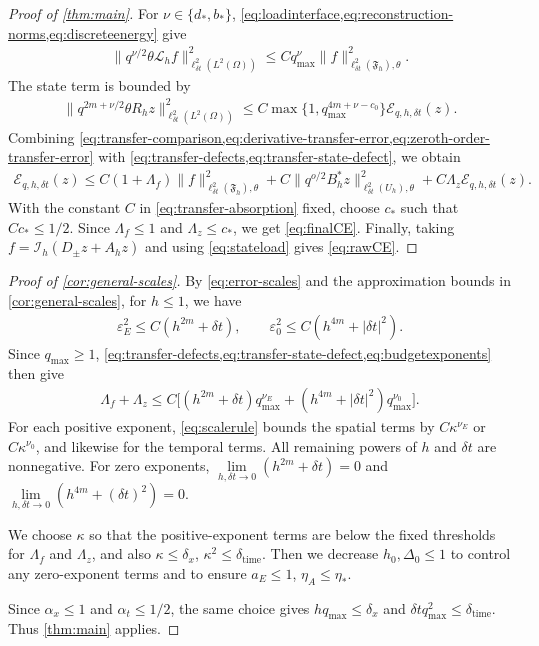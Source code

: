 \documentclass[print,wide,eng]{draft}
\begin{document}
\begin{proof}[Proof of \cref{thm:main}]
For $\nu\in\{d_*,b_*\}$, \cref{eq:loadinterface,eq:reconstruction-norms,eq:discreteenergy} give\vspace{-2mm}
%
\begin{align*}
\|q^{\nu/2}\theta\mathcal L_hf\|_{\ell_{\delta t}^2(L^2(\Omega))}^2
\leq Cq_{\max}^{\nu}\|f\|_{\ell_{\delta t}^2(\mathfrak F_h),\theta}^2.
\end{align*}
%
The state term is bounded by\vspace{-2mm}
%
\begin{align*}
\|q^{2m+\nu/2}\theta R_hz\|_{\ell_{\delta t}^2(L^2(\Omega))}^2
\leq C\max\{1,q_{\max}^{4m+\nu-c_0}\}\mathcal E_{q,h,{\delta t}}(z).
\end{align*}
%
Combining \cref{eq:transfer-comparison,eq:derivative-transfer-error,eq:zeroth-order-transfer-error} with \cref{eq:transfer-defects,eq:transfer-state-defect}, we obtain
%
\begin{align}\label{eq:transfer-absorption}
\mathcal E_{q,h,{\delta t}}(z)\leq C(1+\Lambda_f)\|f\|_{\ell_{\delta t}^2(\mathfrak F_h),\theta}^2
+C\|q^{o/2}B_h^*z\|_{\ell_{\delta t}^2(U_h),\theta}^2
+C\Lambda_z\mathcal E_{q,h,{\delta t}}(z).
\end{align}
%
With the constant $C$ in \cref{eq:transfer-absorption} fixed, choose $c_*$ such that $Cc_*\leq1/2$. Since $\Lambda_f\leq1$ and $\Lambda_z\leq c_*$, we get \cref{eq:finalCE}. Finally, taking $f=\mathcal I_h(D_\pm z+A_hz)$ and using \cref{eq:stateload} gives \cref{eq:rawCE}.
\end{proof}
%

\begin{proof}[Proof of \cref{cor:general-scales}]
By \cref{eq:error-scales} and the approximation bounds in \cref{cor:general-scales}, for $h\leq1$, we have
%
\begin{align*}
\varepsilon_E^2\leq C(h^{2m}+{\delta t}),\qquad
\varepsilon_0^2\leq C(h^{4m}+{|\delta t|}^2).
\end{align*}
%
Since $q_{\max}\geq1$, \cref{eq:transfer-defects,eq:transfer-state-defect,eq:budgetexponents} then give
%
\begin{align*}
\Lambda_f+\Lambda_z\leq C\bigl[(h^{2m}+{\delta t})q_{\max}^{\nu_E}
+(h^{4m}+{|\delta t|}^2)q_{\max}^{\nu_0}\bigr].
\end{align*}
%
For each positive exponent, \cref{eq:scalerule} bounds the spatial terms by $C\kappa^{\nu_E}$ or $C\kappa^{\nu_0}$, and likewise for the temporal terms. All remaining powers of $h$ and ${\delta t}$ are nonnegative. For zero exponents, $\lim\limits_{h,\delta t\to0}(h^{2m}+\delta t)=0$ and $\lim\limits_{h,\delta t\to0}(h^{4m}+(\delta t)^2)=0$.

We choose $\kappa$ so that the positive-exponent terms are below the fixed thresholds for $\Lambda_f$ and $\Lambda_z$, and also $\kappa\leq\delta_x$, $\kappa^2\leq\delta_{\mathrm{time}}$. Then we decrease $h_0,\Delta_0\leq1$ to control any zero-exponent terms and to ensure $a_E\leq1$, $\eta_A\leq\eta_*$.

Since $\alpha_x\leq1$ and $\alpha_t\leq1/2$, the same choice gives $hq_{\max}\leq\delta_x$ and ${\delta t}q_{\max}^2\leq\delta_{\mathrm{time}}$. Thus \cref{thm:main} applies.
\end{proof}
%
\end{document}
